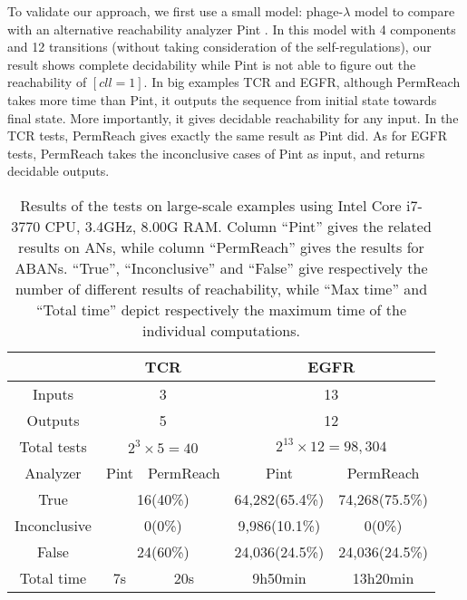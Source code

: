 \documentclass[runningheads]{llncs}
\begin{document}
To validate our approach, we first use a small model: phage-$\lambda$ model \cite{thieffry1995dynamical} to compare with an alternative reachability analyzer Pint \cite{pauleve2012}. In this model with 4 components and 12 transitions (without taking consideration of the self-regulations), our result shows complete decidability while Pint is not able to figure out the reachability of $[cll=1]$. In big examples TCR and EGFR,
although PermReach takes more time than Pint, it outputs the sequence from initial state towards final state. More importantly, it gives decidable reachability for any input. In the TCR tests, PermReach gives exactly the same result as Pint did. As for EGFR tests, PermReach takes the inconclusive cases of Pint as input, and returns decidable outputs.


\begin{table}[ht]
\centering
\tiny
\begin{tabular}{|c|c|c|c|c|}
  \hline
			&	  \multicolumn{2}{c|}{TCR} & \multicolumn{2}{c|}{EGFR}  \\
\hline
Inputs	&	  \multicolumn{2}{c|}{3} & \multicolumn{2}{c|}{13}\\
\hline
  Outputs &	  \multicolumn{2}{c|}{5} & \multicolumn{2}{c|}{12} \\
\hline
  Total tests & \multicolumn{2}{c|}{$2^3\times 5=40$} & \multicolumn{2}{c|}{$2^{13}\times 12=98,304$}\\
\hline
Analyzer      &  Pint       &PermReach   &  Pint       &PermReach             \\
\hline
  True       &  \multicolumn{2}{c|}{16(40\%)}  & 64,282(65.4\%)&74,268(75.5\%)\\
\hline
  Inconclusive & \multicolumn{2}{c|}{0(0\%)}    &9,986(10.1\%)&0(0\%)  \\
\hline
  False      &  \multicolumn{2}{c|}{24(60\%)} &24,036(24.5\%)&24,036(24.5\%)\\
\hline
  Total time &  7s       &  20s        & 9h50min              & 13h20min       \\
\hline

\end{tabular}
\caption{Results of the tests on large-scale examples using Intel Core i7-3770 CPU, \@3.4GHz, 8.00G RAM. Column “Pint” gives the related results on ANs, while column “PermReach” gives the results for ABANs. “True”, “Inconclusive” and “False” give respectively the number of different results of reachability, while “Max time” and “Total time” depict respectively the maximum time of the individual computations.}
\label{tab:2}
\end{table}
\end{document}
